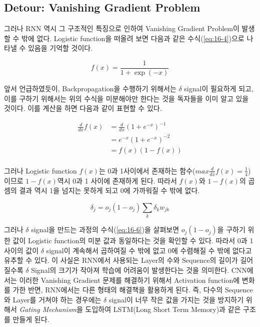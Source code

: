 \documentclass[draft=false]{oblivoir}
\begin{document}
\subsection{Detour: Vanishing Gradient Problem}
그러나 RNN 역시 그 구조적인 특징으로 인하여 Vanishing Gradient Problem이 발생할 수 밖에 없다. Logistic function을 떠올려 보면 다음과 같은 수식(\ref{eq:16-4})으로 나타낼 수 있음을 기억할 것이다.

\begin{equation}
	f(x) = \frac{1}{1+\exp{(-x)}}
	\label{eq:16-4}
\end{equation}

앞서 언급하였듯이, Backpropagation을 수행하기 위해서는 $\delta$ signal이 필요하게 되고, 이를 구하기 위해서는 위의 수식을 미분해야만 한다는 것을 독자들을 이미 알고 있을 것이다. 이를 계산을 하면 다음과 같이 표현할 수 있다.

\begin{equation}
    \begin{split}
        \frac{d}{dx}f(x) & = \frac{d}{dx}(1+e^{-x})^{-1} \\
        & = e^{-x}(1+e^{-x})^{-2} \\
        & = f(x)(1-f(x))\\
    \end{split}
    \label{eq:16-5}
\end{equation}

그러나 Logistic function $f(x)$는 0과 1사이에서 존재하는 함수($max \frac{d}{dx}f(x) = \frac{1}{4}$)이므로 $1-f(x)$역시 0과 1 사이에 존재하게 된다. 따라서 $f(x)$와 $1-f(x)$의 곱셈의 결과 역시 1을 넘지는 못하게 되고 0에 가까워질 수 밖에 없다. 

\begin{equation}
 	\delta_j = o_j (1-o_j ) \sum_{k}\delta_{k}w_{jk}
 	\label{eq:16-6}
 \end{equation}
 
그러나 $\delta$ signal을 만드는 과정의 수식(\ref{eq:16-6})을 살펴보면 $o_j (1-o_j)$을 구하기 위한 값이 Logistic function의 미분 값과 동일하다는 것을 확인할 수 있다. 따라서 0과 1 사이의 값이 $\delta$ signal이 계속해서 곱하여질 수 밖에 없고 0에 수렴해질 수 밖에 없다고 유추할 수 있다. 이 사실은 RNN에서 사용되는 Layer의 수와 Sequence의 길이가 길어질수록 $\delta$ Signal의 크기가 작아져 학습에 어려움이 발생한다는 것을 의미한다. CNN에서는 이러한 Vanishing Gradient 문제를 해결하기 위해서 Activation function에 변화를 가한 반면, RNN에서는 다른 형태의 해결책을 활용하게 된다. 즉, 다수의 Sequence와 Layer를 거쳐야 하는 경우에는 $\delta$ signal이 너무 작은 값을 가지는 것을 방지하기 위해서 \textit{Gating Mechanism}을 도입하여 LSTM(Long Short Term Memory)과 같은 구조를 만들게 된다. 
 
\end{document}
